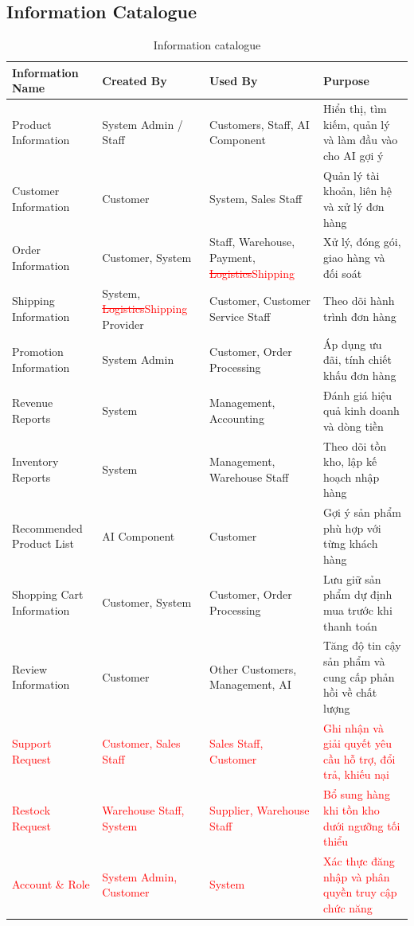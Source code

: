 \documentclass[12pt,a4paper,oneside]{report}
\newif\ifmark \marktrue
\newcommand{\chg}[1]{\ifmark\textcolor{red}{#1}\else #1\fi}
\newcommand{\del}[1]{\ifmark\textcolor{red}{\sout{#1}}\fi}
\begin{document}
\subsection{Information Catalogue}

\begin{longtable}{p{3.3cm}p{2.9cm}p{3.6cm}p{6.2cm}}
\caption{Information catalogue}\\
\toprule
\textbf{Information Name} & \textbf{Created By} & \textbf{Used By} & \textbf{Purpose} \\
\midrule
\endhead
\bottomrule
\endlastfoot
Product Information & System Admin / Staff & Customers, Staff, AI Component & Hiển thị, tìm kiếm, quản lý và làm đầu vào cho AI gợi ý \\
Customer Information & Customer & System, Sales Staff & Quản lý tài khoản, liên hệ và xử lý đơn hàng \\
Order Information & Customer, System & Staff, Warehouse, Payment, \del{Logistics}\chg{Shipping} & Xử lý, đóng gói, giao hàng và đối soát \\
Shipping Information & System, \del{Logistics}\chg{Shipping} Provider & Customer, Customer Service Staff & Theo dõi hành trình đơn hàng \\
Promotion Information & System Admin & Customer, Order Processing & Áp dụng ưu đãi, tính chiết khấu đơn hàng \\
Revenue Reports & System & Management, Accounting & Đánh giá hiệu quả kinh doanh và dòng tiền \\
Inventory Reports & System & Management, Warehouse Staff & Theo dõi tồn kho, lập kế hoạch nhập hàng \\
Recommended Product List & AI Component & Customer & Gợi ý sản phẩm phù hợp với từng khách hàng \\
Shopping Cart Information & Customer, System & Customer, Order Processing & Lưu giữ sản phẩm dự định mua trước khi thanh toán \\
Review Information & Customer & Other Customers, Management, AI & Tăng độ tin cậy sản phẩm và cung cấp phản hồi về chất lượng \\
\chg{Support Request} & \chg{Customer, Sales Staff} & \chg{Sales Staff, Customer} & \chg{Ghi nhận và giải quyết yêu cầu hỗ trợ, đổi trả, khiếu nại} \\
\chg{Restock Request} & \chg{Warehouse Staff, System} & \chg{Supplier, Warehouse Staff} & \chg{Bổ sung hàng khi tồn kho dưới ngưỡng tối thiểu} \\
\chg{Account \& Role} & \chg{System Admin, Customer} & \chg{System} & \chg{Xác thực đăng nhập và phân quyền truy cập chức năng} \\
\end{longtable}
\end{document}
